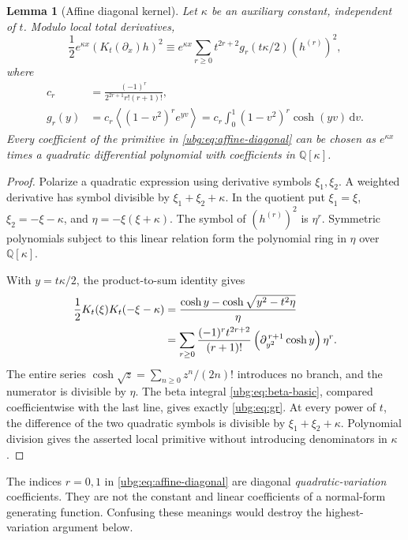 \documentclass[11pt,letterpaper]{article}
\numberwithin{equation}{section}
\newtheorem{lemma}[theorem]{Lemma}
\theoremstyle{definition}\newtheorem{definition}[theorem]{Definition}
\theoremstyle{remark}\newtheorem{remark}[theorem]{Remark}
\newcommand{\Q}{\mathbb Q}\newcommand{\C}{\mathbb C}\newcommand{\N}{\mathbb N}
\newcommand{\dd}{\,\mathrm d}\newcommand{\ii}{\mathrm i}
\newcommand{\av}[1]{\left\langle #1\right\rangle}
\begin{document}
\begin{lemma}[Affine diagonal kernel]\label{ubg:lem:affine}
Let $\kappa$ be an auxiliary constant, independent of $t$. Modulo local
total derivatives,
\begin{equation}\label{ubg:eq:affine-diagonal}
 \frac12e^{\kappa x}(K_t(\partial_x)h)^2
 \equiv e^{\kappa x}\sum_{r\ge0}t^{2r+2}
           g_r(t\kappa/2)(h^{(r)})^2,
\end{equation}
where
\begin{align}
 c_r&=\frac{(-1)^r}{2^{2r+1}r!(r+1)!},
 \label{ubg:eq:cr}\\
 g_r(y)&=c_r\av{(1-v^2)^r e^{yv}}
       =c_r\int_0^1(1-v^2)^r\cosh(yv)\dd v.
 \label{ubg:eq:gr}
\end{align}
Every coefficient of the primitive in \eqref{ubg:eq:affine-diagonal}
can be chosen as $e^{\kappa x}$ times a quadratic differential polynomial
with coefficients in $\Q[\kappa]$.
\end{lemma}
\begin{proof}
Polarize a quadratic expression using derivative symbols $\xi_1,\xi_2$.
A weighted derivative has symbol divisible by
$\xi_1+\xi_2+\kappa$. In the quotient put
$\xi_1=\xi$, $\xi_2=-\xi-\kappa$, and
$\eta=-\xi(\xi+\kappa)$. The symbol of $(h^{(r)})^2$ is $\eta^r$.
Symmetric polynomials subject to this linear relation form the polynomial
ring in $\eta$ over $\Q[\kappa]$.

With $y=t\kappa/2$, the product-to-sum identity gives
\begin{align}
 \frac12K_t(\xi)K_t(-\xi-\kappa)
 &=\frac{\cosh y-\cosh\sqrt{y^2-t^2\eta}}\eta\notag\\
 &=\sum_{r\ge0}\frac{(-1)^rt^{2r+2}}{(r+1)!}
       \left(\partial_{y^2}^{\,r+1}\cosh y\right)\eta^r.
 \label{ubg:eq:affine-symbol}
\end{align}
The entire series $\cosh\sqrt z=\sum_{n\ge0}z^n/(2n)!$ introduces no
branch, and the numerator is divisible by $\eta$.
The beta integral \eqref{ubg:eq:beta-basic}, compared coefficientwise
with the last line, gives exactly \eqref{ubg:eq:gr}. At every power
of $t$, the difference of the two quadratic symbols is divisible by
$\xi_1+\xi_2+\kappa$. Polynomial division gives the asserted local
primitive without introducing denominators in $\kappa$.
\end{proof}

The indices $r=0,1$ in \eqref{ubg:eq:affine-diagonal} are diagonal
\emph{quadratic-variation} coefficients. They are not the constant and
linear coefficients of a normal-form generating function. Confusing
these meanings would destroy the highest-variation argument below.
\end{document}
